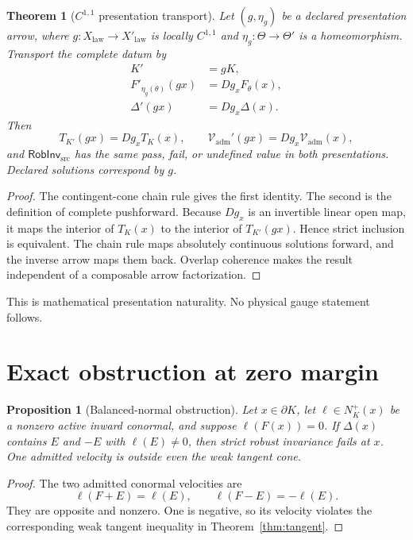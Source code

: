 \documentclass[11pt]{article}
\newtheorem{theorem}{Theorem}
\newtheorem{proposition}{Proposition}
\newcommand{\RobInv}{\mathsf{RobInv}_{\mathrm{src}}}
\newcommand{\Vad}{\mathcal V_{\mathrm{adm}}}
\begin{document}
\begin{theorem}[\(C^{1,1}\) presentation transport]
\label{thm:transport}
Let \((g,\eta_g)\) be a declared presentation arrow, where
\(g:X_{\mathrm{law}}\to X'_{\mathrm{law}}\) is locally \(C^{1,1}\) and
\(\eta_g:\Theta\to\Theta'\) is a homeomorphism.  Transport the complete
datum by
\begin{align*}
 K'&=gK,\\
 F'_{\eta_g(\theta)}(gx)&=Dg_xF_\theta(x),\\
 \Delta'(gx)&=Dg_x\Delta(x).
\end{align*}
Then
\[
 T_{K'}(gx)=Dg_xT_K(x),\qquad
 \Vad'(gx)=Dg_x\Vad(x),
\]
and \(\RobInv\) has the same pass, fail, or undefined value in both
presentations.  Declared solutions correspond by \(g\).
\end{theorem}

\begin{proof}
The contingent-cone chain rule gives the first identity.  The second is the
definition of complete pushforward.  Because \(Dg_x\) is an invertible linear
open map, it maps the interior of \(T_K(x)\) to the interior of
\(T_{K'}(gx)\).  Hence strict inclusion is equivalent.  The chain rule maps
absolutely continuous solutions forward, and the inverse arrow maps them
back.  Overlap coherence makes the result independent of a composable arrow
factorization.
\end{proof}

This is mathematical presentation naturality.  No physical gauge statement
follows.

\section{Exact obstruction at zero margin}

\begin{proposition}[Balanced-normal obstruction]
\label{prop:balanced}
Let \(x\in\partial K\), let \(\ell\in N_K^+(x)\) be a nonzero active inward
conormal, and suppose \(\ell(F(x))=0\).  If \(\Delta(x)\) contains \(E\) and
\(-E\) with \(\ell(E)\neq0\), then strict robust invariance fails at \(x\).
One admitted velocity is outside even the weak tangent cone.
\end{proposition}

\begin{proof}
The two admitted conormal velocities are
\[
 \ell(F+E)=\ell(E),\qquad
 \ell(F-E)=-\ell(E).
\]
They are opposite and nonzero.  One is negative, so its velocity violates
the corresponding weak tangent inequality in Theorem~\ref{thm:tangent}.
\end{proof}
\end{document}
